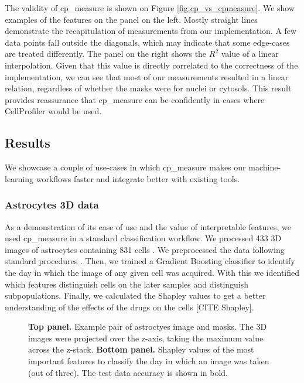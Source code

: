 \documentclass{article}
\begin{document}
The validity of cp\_measure is shown on Figure \ref{fig:cp_vs_cpmeasure}. We show examples of the features on the panel on the left. Mostly straight lines demonstrate the recapitulation of measurements from our implementation. A few data points fall outside the diagonals, which may indicate that some edge-cases are treated differently. The panel on the right shows the \(R^2\) value of a linear interpolation. Given that this value is directly correlated to the correctness of the implementation, we can see that most of our measurements resulted in a linear relation, regardless of whether the masks were for nuclei or cytosols. This result provides reassurance that cp\_measure can be confidently in cases where CellProfiler would be used.
\subsection{Results}
\label{sec:orge5b5c6b}
We showcase a couple of use-cases in which cp\_measure makes our machine-learning workflows faster and integrate better with existing tools.
\subsubsection{Astrocytes 3D data}
\label{sec:org447090b}

As a demonstration of its ease of use and the value of interpretable features, we used cp\_measure in a standard classification workflow. We processed 433 3D images of astrocytes containing 831 cells \citep{kalinin3DCellNuclear2018}. We preprocessed the data following standard procedures \citep{caicedoDataanalysisStrategiesImagebased2017}. Then, we trained a Gradient Boosting classifier to identify the day in which the image of any given cell was acquired. With this we identified which features distinguish cells on the later samples and distinguish subpopulations. Finally, we calculated the Shapley values to get a better understanding of the effects of the drugs on the cells [CITE Shapley].

\begin{figure}[htbp]
\centering

\caption{\label{fig:astrocytes}\textbf{Top panel.} Example pair of astroctyes image and masks. The 3D images were projected over the z-axis, taking the maximum value across the z-stack. \textbf{Bottom panel.} Shapley values of the most important features to classify the day in which an image was taken (out of three). The test data accuracy is shown in bold.}
\end{figure}
\end{document}
